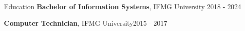\begin{rSection}{Education}
    {\bf Bachelor of Information Systems}, IFMG University \hfill {2018 - 2024}

    {\bf Computer Technician}, IFMG University\hfill {2015 - 2017}
\end{rSection}
